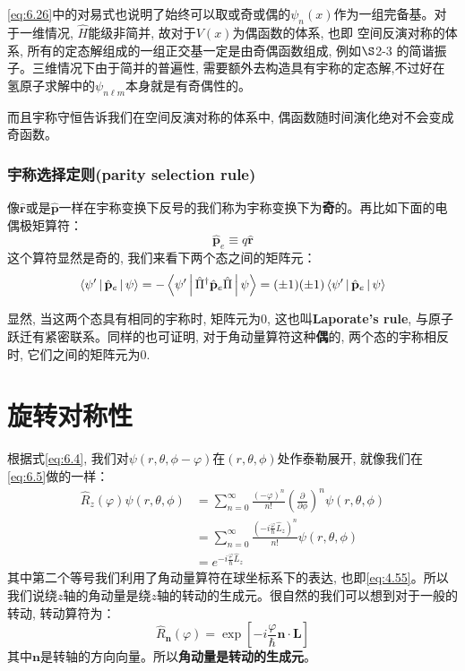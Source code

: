 \ref{eq:6.26}中的对易式也说明了始终可以取或奇或偶的$\psi_n(x)$作为一组完备基。对于一维情况, $\hat{H}$能级非简并, 故对于$V(x)$为偶函数的体系, 也即
空间反演对称的体系, 所有的定态解组成的一组正交基一定是由奇偶函数组成, 例如$\S$2-3 的简谐振子。三维情况下由于简并的普遍性, 需要额外去构造具有宇称的定态解,不过好在
氢原子求解中的$\psi_{n\ell m}$本身就是有奇偶性的。

而且宇称守恒告诉我们在空间反演对称的体系中, 偶函数随时间演化绝对不会变成奇函数。

\subsubsection*{宇称选择定则(parity selection rule)}
像$\hat{\mathbf{r}}$或是$\hat{\mathbf{p}}$一样在宇称变换下反号的我们称为宇称变换下为\textbf{奇}的。再比如下面的电偶极矩算符：
\[\hat{\mathbf{p}}_e\equiv q\hat{\mathbf{r}}\]
这个算符显然是奇的, 我们来看下两个态之间的矩阵元：
\begin{equation}
    \Braket{\psi^\prime|\hat{\mathbf{p}}_e|\psi}=-\Braket{\psi^\prime|\hat{\Pi}^\dagger\hat{\mathbf{p}}_e\hat{\Pi}|\psi}=(\pm 1)(\pm 1)\Braket{\psi^\prime|\hat{\mathbf{p}}_e|\psi}
\end{equation}

显然, 当这两个态具有相同的宇称时, 矩阵元为0, 这也叫\textbf{Laporate's rule}, 与原子跃迁有紧密联系。同样的也可证明, 对于角动量算符这种\textbf{偶}的, 
两个态的宇称相反时, 它们之间的矩阵元为0.

\section{旋转对称性}
根据式\ref{eq:6.4}, 我们对$\psi(r,\theta,\phi-\varphi)$在$(r,\theta,\phi)$处作泰勒展开, 就像我们在\ref{eq:6.5}做的一样：
\begin{align*}
    \hat R_z(\varphi)\psi(r,\theta,\phi)&=\sum_{n=0}^\infty\frac{(-\varphi)^n}{n!}\left(\frac{\partial}{\partial \phi}\right)^n\psi(r,\theta,\phi)\\
    &=\sum_{n=0}^\infty\frac{\left(-i\frac{\varphi}{\hbar}\hat{L}_z\right)^n}{n!}\psi(r,\theta,\phi)\\
    &=\boxed{e^{-i\frac{\varphi}{\hbar}\hat{L}_z}}
\end{align*}
其中第二个等号我们利用了角动量算符在球坐标系下的表达, 也即\ref{eq:4.55}。所以我们说绕$z$轴的角动量是绕$z$轴的转动的生成元。很自然的我们可以想到对于一般的转动, 转动算符为：
\begin{equation}
    \boxed{
        \hat{R}_{\mathbf{n}}(\varphi)=\exp{\left[-i\frac{\varphi}{\hbar}\mathbf{n}\cdot\mathbf{L}\right]}
    }
\end{equation}
其中$\mathbf{n}$是转轴的方向向量。所以\textbf{角动量是转动的生成元}。

